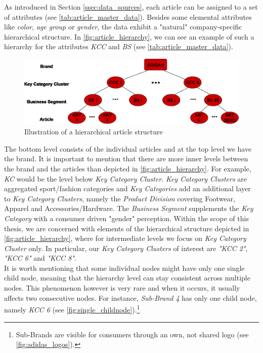 


As introduced in Section \ref{ssec:data_sources}, each article can be assigned to a set of attributes (see \autoref{tab:article_master_data}). 
Besides some elemental attributes like \textit{color}, \textit{age group} or \textit{gender}, the data exhibit a "natural" company-specific hierarchical structure. In \autoref{fig:article_hierarchy}, we can see an example of such a hierarchy for the attributes \textit{\ac{KCC}} and \textit{\ac{BS}} (see \autoref{tab:article_master_data}).
\\

\begin{figure}[H]
\centering
  \includegraphics[width=0.95\linewidth]{figures/article_tree_KCC_BS.eps}
  \caption{Illustration of a hierarchical article structure}
  \label{fig:article_hierarchy}
\end{figure}

The bottom level consists of the individual articles and at the top level we have the brand. It is important to mention that there are more inner levels between the brand and the articles than depicted in \autoref{fig:article_hierarchy}. For example, \textit{\ac{KC}} would be the level below \textit{Key Category Cluster}. \textit{Key Category Clusters} are aggregated sport/fashion categories and \textit{Key Categories} add an additional layer to \textit{Key Category Clusters}, namely the \textit{Product Division} covering Footwear, Apparel and Accessories/Hardware. The \textit{Business Segment} supplements the \textit{Key Category} with a consumer driven "gender" perception.
Within the scope of this thesis, we are concerned with elements of the hierarchical structure depicted in \autoref{fig:article_hierarchy}, where for intermediate levels we focus on \textit{Key Category Cluster} only. In particular, our \textit{Key Category Clusters} of interest are \textit{"KCC 2"}, \textit{"KCC 6"} and \textit{"KCC 8"}.
\\
It is worth mentioning that some individual nodes might have only one single child node, meaning that the hierarchy level can stay consistent across multiple nodes. This phenomenon however is very rare and when it occurs, it usually affects two consecutive nodes. For instance, \textit{Sub-Brand 4} has only one child node, namely \textit{KCC 6} (see \autoref{fig:single_childnode}).\footnote{Sub-Brands are visible for consumers through an own, not shared logo (see \autoref{fig:adidas_logos}).}
\\

